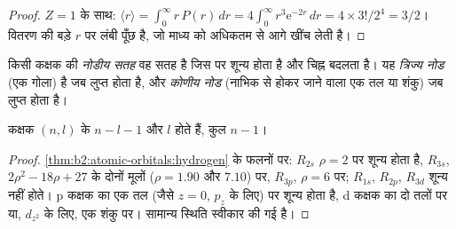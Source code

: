\begin{proof}
$Z = 1$ के साथ: $\langle r\rangle = \int_0^\infty r\,P(r)\,dr = 4\int_0^\infty r^3\mathrm e^{-2r}
\,dr = 4 \times 3!/2^4 = 3/2$। वितरण की बड़े $r$ पर लंबी पूँछ है,
जो माध्य को अधिकतम से आगे खींच लेती है।
\end{proof}

\begin{definition}[नोड]\label{def:b2:atomic-orbitals:node}
किसी कक्षक की \emph{नोडीय सतह} वह सतह है जिस पर
 शून्य होता है और चिह्न बदलता है। यह \emph{त्रिज्य नोड}
(एक गोला) है जब  लुप्त होता है, और \emph{कोणीय
नोड} (नाभिक से होकर जाने वाला एक तल या शंकु) जब 
लुप्त होता है।
\end{definition}

\begin{proposition}[नोडों की गिनती]\label{prop:b2:atomic-orbitals:nodes}
कक्षक $(n, l)$ के $n - l - 1$  और $l$  होते हैं, कुल
$n - 1$।
\end{proposition}

\begin{proof}
\cref{thm:b2:atomic-orbitals:hydrogen} के फलनों पर: $R_{2s}$
$\rho = 2$ पर शून्य होता है, $R_{3s}$, $2\rho^2 - 18\rho + 27$ के दोनों मूलों ($\rho = 1.90$ और $7.10$) पर,
$R_{3p}$, $\rho = 6$ पर; $R_{1s}$, $R_{2p}$, $R_{3d}$ शून्य नहीं होते। p कक्षक का 
एक तल (जैसे $z = 0$, $p_z$ के लिए) पर शून्य होता है, d कक्षक का दो
तलों पर या, $d_{z^2}$ के लिए, एक शंकु पर। सामान्य स्थिति स्वीकार की गई है।
\end{proof}

